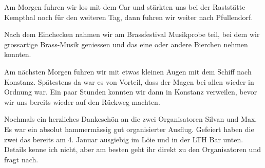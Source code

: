 \begin{history}
    Am Morgen fuhren wir los mit dem Car und stärkten uns bei der Raststätte
    Kempthal noch für den weiteren Tag, dann fuhren wir weiter nach Pfullendorf.

    Nach dem Einchecken nahmen wir am Brassfestival Musikprobe teil, bei dem wir
    grossartige Brass-Musik geniessen und das eine oder andere Bierchen nehmen
    konnten.

    Am nächsten Morgen fuhren wir mit etwas kleinen Augen mit dem Schiff nach
    Konstanz. Spätestens da war es von Vorteil, dass der Magen bei allen wieder
    in Ordnung war. Ein paar Stunden konnten wir dann in Konstanz verweilen,
    bevor wir uns bereits wieder auf den Rückweg machten.

    Nochmals ein herzliches Dankeschön an die zwei Organisatoren Silvan und Max.
    Es war ein absolut hammermässig gut organisierter Ausflug. Gefeiert haben
    die zwei das bereits am 4. Januar ausgiebig im Löie und in der LTH Bar
    unten. Details kenne ich nicht, aber am besten geht ihr direkt zu den
    Organisatoren und fragt nach.


\end{history}

